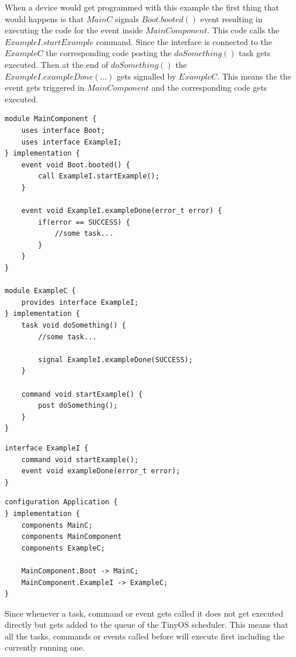 When a device would get programmed with this example the first thing that would happens is that $MainC$ signals $Boot.booted()$ event resulting in executing the code for the event inside $MainComponent$. This code calls the $ExampleI.startExample$ command. Since the interface is connected to the $ExampleC$ the corresponding code posting the $doSomething()$ task gets executed. Then at the end of $doSomething()$ the $ExampleI.exampleDone(...)$ gets signalled by $ExampleC$. This means the the event gets triggered in $MainComponent$ and the corresponding code gets executed.      

\begin{lstlisting}
module MainComponent {
	uses interface Boot;
	uses interface ExampleI;
} implementation {
	event void Boot.booted() {
		call ExampleI.startExample();
	}
	
	event void ExampleI.exampleDone(error_t error) {
		if(error == SUCCESS) {
			//some task...
		}
	}
}

module ExampleC {
	provides interface ExampleI;
} implementation {
	task void doSomething() {
		//some task...
		
		signal ExampleI.exampleDone(SUCCESS);
	}
	
	command void startExample() {
		post doSomething();
	}
}
\end{lstlisting}


\begin{lstlisting}
interface ExampleI {
	command void startExample();
	event void exampleDone(error_t error);
}
\end{lstlisting}

\begin{lstlisting}
configuration Application {
} implementation {
	components MainC;
	components MainComponent
	components ExampleC;
		
	MainComponent.Boot -> MainC;
	MainComponent.ExampleI -> ExampleC;
}
\end{lstlisting} 

Since whenever a task, command or event gets called it does not get executed directly but gets added to the queue of the TinyOS scheduler. This means that all the tasks, commands or events called before will execute first including the currently running one. 